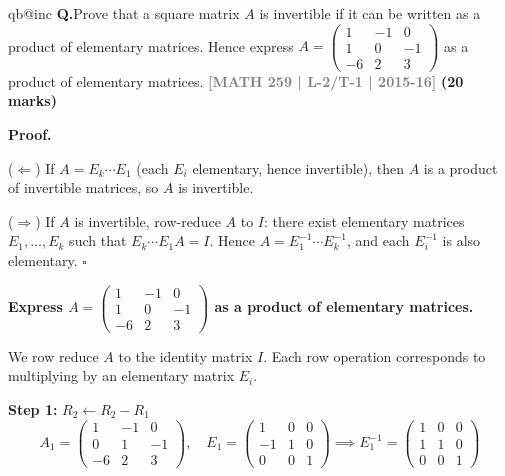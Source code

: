 \documentclass[12pt,a3paper]{article}
\makeatletter
\newcommand{\yr}[1]{\hfill\textcolor{gray}{\small\textbf{[#1]}}}
\newcommand{\mk}[1]{\textcolor{orange!70!black}{\small\textbf{(#1 marks)}}}
\newcounter{qnum}
\newcommand{\Q}[1]{%
  \csname qb@inc\endcsname
  \needspace{4\baselineskip}
  \refstepcounter{qnum}
  \vspace{6pt}
  \noindent\textbf{Q\theqnum.}\enspace #1\par
}
\makeatother
\begin{document}
\Q{Prove that a square matrix $A$ is invertible if it can be written as a product of elementary matrices. Hence express $A = \begin{pmatrix} 1 & -1 & 0 \\ 1 & 0 & -1 \\ -6 & 2 & 3 \end{pmatrix}$ as a product of elementary matrices.
\yr{MATH 259 | L-2/T-1 | 2015-16} \mk{20}}
\begin{tcolorbox}[enhanced,breakable,
  colback=cB!4,colframe=cB,boxrule=0.8pt,arc=5pt,
  title={\textbf{Answer --- Invertible $\Leftrightarrow$ Product of Elementary Matrices}},
  fonttitle=\bfseries\color{white},colbacktitle=cB]

\textbf{Proof.}

($\Leftarrow$) If $A = E_k\cdots E_1$ (each $E_i$ elementary, hence invertible), then $A$ is a product of invertible matrices, so $A$ is invertible.

($\Rightarrow$) If $A$ is invertible, row-reduce $A$ to $I$: there exist elementary matrices $E_1,\ldots,E_k$ such that $E_k\cdots E_1 A = I$. Hence $A = E_1^{-1}\cdots E_k^{-1}$, and each $E_i^{-1}$ is also elementary. \hfill$\square$

\medskip
\textbf{Express $A=\begin{pmatrix}1&-1&0\\1&0&-1\\-6&2&3\end{pmatrix}$ as a product of elementary matrices.}

We row reduce $A$ to the identity matrix $I$. Each row operation corresponds to multiplying by an elementary matrix $E_i$.

\textbf{Step 1:} $R_2 \leftarrow R_2 - R_1$
\[
A_1 = \begin{pmatrix}1&-1&0\\0&1&-1\\-6&2&3\end{pmatrix}, \quad
E_1 = \begin{pmatrix}1&0&0\\-1&1&0\\0&0&1\end{pmatrix} \implies E_1^{-1} = \begin{pmatrix}1&0&0\\1&1&0\\0&0&1\end{pmatrix}
\]


\end{tcolorbox}
\end{document}
